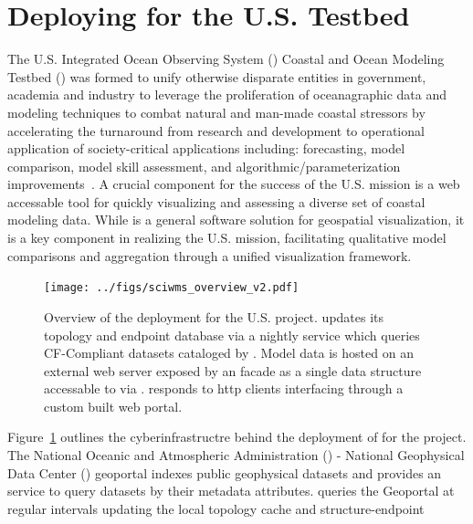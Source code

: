 \section{Deploying \sciwms{} for the U.S. \ioos{} \comt{} Testbed}

The U.S. Integrated Ocean Observing System (\ioos{}) Coastal and Ocean
Modeling Testbed (\comt{}) was formed to unify otherwise disparate
entities in government, academia and industry to leverage the
proliferation of oceanagraphic data and modeling techniques to combat
natural and man-made coastal stressors by accelerating the turnaround
from research and development to operational application of
society-critical applications including: forecasting, model
comparison, model skill assessment, and algorithmic/parameterization
improvements~\cite{luettich13}. A crucial component for the success of
the U.S. \ioos{} \comt{} mission is a web accessable tool for quickly
visualizing and assessing a diverse set of coastal modeling
data. While \sciwms{} is a general software solution for geospatial
visualization, it is a key component in realizing the U.S. \ioos{}
\comt{} mission, facilitating qualitative model comparisons and
aggregation through a unified visualization framework.
\begin{figure}[ht!]
  \centering
  \texttt{[image: ../figs/sciwms\_overview\_v2.pdf]}
  \caption{Overview of the \sciwms{} deployment for the U.S. \ioos{}
    \comt{} project. \Sciwms{} updates its topology and endpoint
    database via a nightly service which queries CF-Compliant datasets
    cataloged by \ngdc{}. Model data is hosted on an external web server
    exposed by an \ncml{} facade as a single \netcdf{} data structure
    accessable to \sciwms{} via \opendap{}. \Sciwms{} responds to http
    clients interfacing through a custom built web portal.}
  \label{fig:overview1}
\end{figure}
Figure~\ref{fig:overview1} outlines the cyberinfrastructre behind the
deployment of \sciwms{} for the \comt{} project. The National Oceanic
and Atmospheric Administration (\noaa{}) - National Geophysical Data
Center (\ngdc{}) geoportal indexes public geophysical datasets and
provides an \ogc{} \csw{} service to query datasets by their metadata
attributes. \sciwms{} queries the \ngdc{} Geoportal at regular
intervals updating the local topology cache and structure-endpoint
